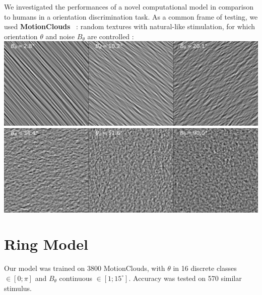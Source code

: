 \documentclass[a0,portrait]{a0poster}
\begin{document}
\begin{multicols}{3}
We investigated the performances of a novel computational model in comparison to humans in a orientation discrimination task. As a common frame of testing, we used \textbf{MotionClouds}~\citep{Sanz12} : random textures with natural-like stimulation, for which orientation $\theta$ and noise $B_\theta$ are controlled :
\includegraphics[width=1.\linewidth]{Fig_intro_MC1.pdf}
\includegraphics[width=1.\linewidth]{Fig_intro_MC2.pdf}
\color{Black} %
\section*{Ring Model} %

Our model was trained on 3800 MotionClouds, with $\theta$ in 16 discrete classes  $ \in [ 0; \pi ]$ and  $B_\theta$ continuous  $\in [1; 15^\circ]$. Accuracy was tested on 570 similar stimulus.


\end{multicols}
\end{document}
